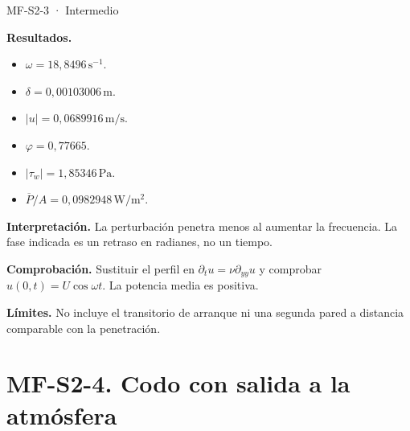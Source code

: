 \begin{studiumworked}{MF-S2-3 · Intermedio}
\begin{enumerate}
\end{enumerate}

\textbf{Resultados.}\begin{itemize}

\item $\omega=18{,}8496\,\mathrm{s^{-1}}$.

\item $\delta=0{,}00103006\,\mathrm{m}$.

\item $|u|=0{,}0689916\,\mathrm{m/s}$.

\item $\varphi=0{,}77665$.

\item $|\tau_w|=1{,}85346\,\mathrm{Pa}$.

\item $\overline P/A=0{,}0982948\,\mathrm{W/m^2}$.

\end{itemize}

\textbf{Interpretación.} La perturbación penetra menos al aumentar la frecuencia. La fase indicada es un retraso en radianes, no un tiempo.

\textbf{Comprobación.} Sustituir el perfil en $\partial_tu=\nu\partial_{yy}u$ y comprobar $u(0,t)=U\cos\omega t$. La potencia media es positiva.

\textbf{Límites.} No incluye el transitorio de arranque ni una segunda pared a distancia comparable con la penetración.

\end{studiumworked}

\Needspace{.30\textheight}\section{MF-S2-4. Codo con salida a la atmósfera}

